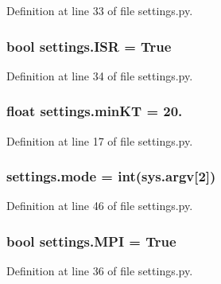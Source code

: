 Definition at line 33 of file settings.\+py.

\subsubsection[{\texorpdfstring{I\+SR}{ISR}}]{\setlength{\rightskip}{0pt plus 5cm}bool settings.\+I\+SR = True}\hypertarget{namespacesettings_a35611de950cb2fb15983284123fa724c}{}\label{namespacesettings_a35611de950cb2fb15983284123fa724c}


Definition at line 34 of file settings.\+py.

\subsubsection[{\texorpdfstring{min\+KT}{minKT}}]{\setlength{\rightskip}{0pt plus 5cm}float settings.\+min\+KT = 20.}\hypertarget{namespacesettings_a041ea5ae27a35144e20d819d903e242f}{}\label{namespacesettings_a041ea5ae27a35144e20d819d903e242f}


Definition at line 17 of file settings.\+py.

\subsubsection[{\texorpdfstring{mode}{mode}}]{\setlength{\rightskip}{0pt plus 5cm}settings.\+mode = int(sys.\+argv\mbox{[}2\mbox{]})}\hypertarget{namespacesettings_a51b31b0cdbe61e6cd2f758e8560898e9}{}\label{namespacesettings_a51b31b0cdbe61e6cd2f758e8560898e9}


Definition at line 46 of file settings.\+py.

\subsubsection[{\texorpdfstring{M\+PI}{MPI}}]{\setlength{\rightskip}{0pt plus 5cm}bool settings.\+M\+PI = True}\hypertarget{namespacesettings_aa5b9f7d5c3011f7d0e4390a0955190e2}{}\label{namespacesettings_aa5b9f7d5c3011f7d0e4390a0955190e2}


Definition at line 36 of file settings.\+py.

